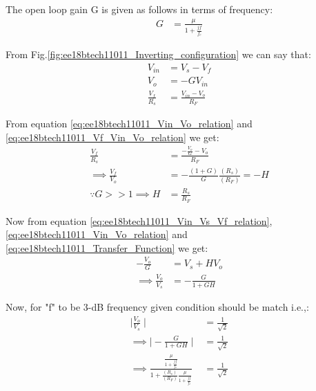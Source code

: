 \begin{enumerate}[label=\arabic*.,ref=\theenumi]
The open loop gain G is given as follows in terms of frequency:
\begin{align}
    G &= \frac{\mu}{1 + \frac{jf}{f_{c}}}
\end{align}

From Fig.\ref{fig:ee18btech11011_Inverting_configuration} we can say that:
\begin{align}
    V_{i n} &= V_{s} - V_{f}
    \label{eq:ee18btech11011_Vin_Vs_Vf_relation}
    \\
    V_{o} &= -GV_{i n}
    \label{eq:ee18btech11011_Vin_Vo_relation}
    \\
    \frac{V_{f}}{R_{s}} &= \frac{V_{i n} - V_{o}}{R_{F}}
    \label{eq:ee18btech11011_Vf_Vin_Vo_relation}
\end{align}

From equation \ref{eq:ee18btech11011_Vin_Vo_relation} and \ref{eq:ee18btech11011_Vf_Vin_Vo_relation} we get:
\begin{align}
    \frac{V_{f}}{R_{s}} &= \frac{-\frac{V_{o}}{G} - V_{o}}{R_{F}}
    \\
    \implies \frac{V_{f}}{V_{o}} &= -\frac{(1 + G)}{G}\frac{(R_{s})}{(R_{F})} = -H
    \label{eq:ee18btech11011_Transfer_Function}
    \\
    \because G>>1 \implies H &= \frac{R_{s}}{R_{F}}
\end{align}

Now from equation \ref{eq:ee18btech11011_Vin_Vs_Vf_relation}, \ref{eq:ee18btech11011_Vin_Vo_relation} and \ref{eq:ee18btech11011_Transfer_Function} we get:
\begin{align}
    -\frac{V_{o}}{G} &= V_{s} + HV_{o}
    \\
    \implies \frac{V_{o}}{V_{s}} &= -\frac{G}{1 + GH}
\end{align}

Now, for "f" to be 3-dB frequency given condition should be match i.e.,:
\begin{align}
    \mid\frac{V_{o}}{V_{s}}\mid &= \frac{1}{\sqrt{2}}
    \\
    \implies \mid-\frac{G}{1 + GH}\mid &= \frac{1}{\sqrt{2}}
    \\
    \implies \frac{\frac{\mu}{1 + \frac{jf}{f_{c}}}}{1 + \frac{(R_{s})}{(R_{F})}\frac{\mu}{1 + \frac{jf}{f_{c}}}} &= \frac{1}{\sqrt{2}}
\end{align}
 
\begin{table}[!ht]
\centering

\caption{}
\label{table: Values_Table}
\end{table}


\end{enumerate}
